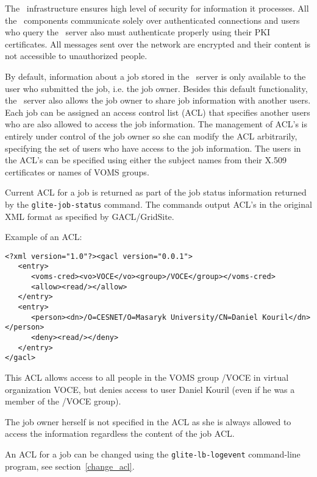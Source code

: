 The \LB\ infrastructure ensures high level of security for information it
processes. All the \LB\ components communicate solely over authenticated
connections and users who query the \LB\ server also must authenticate properly
using their PKI certificates. All messages sent over the network are encrypted
and their content is not accessible to unauthorized people.

By default, information about a job stored in the \LB\ server is only available
to the user who submitted the job, i.e. the job owner.  Besides this default
functionality, the \LB\ server also allows the job owner to share job
information with another users. Each job can be assigned an access control list
(ACL) that specifies another users who are also allowed to access the job
information. The management of ACL's is entirely under control of the job owner
so she can modify the ACL arbitrarily, specifying the set of users who have
access to the job information. The users in the ACL's can be specified using
either the subject names from their X.509 certificates or names of VOMS groups.

Current ACL for a job is returned as part of the job status information
returned by the \verb'glite-job-status' command. The commands output ACL's in
the original XML format as specified by GACL/GridSite. 

Example of an ACL:
\begin{verbatim}
<?xml version="1.0"?><gacl version="0.0.1">
   <entry>
      <voms-cred><vo>VOCE</vo><group>/VOCE</group></voms-cred>
      <allow><read/></allow>
   </entry>
   <entry>
      <person><dn>/O=CESNET/O=Masaryk University/CN=Daniel Kouril</dn></person>
      <deny><read/></deny>
   </entry>
</gacl>
\end{verbatim}

This ACL allows access to all people in the VOMS group /VOCE in virtual
organization VOCE, but denies access to user Daniel Kouril (even if he was a
member of the /VOCE group).

The job owner herself is not specified in the ACL as she is always allowed to
access the information regardless the content of the job ACL.

An ACL for a job can be changed using the \verb'glite-lb-logevent' command-line
program, see section~\ref{change_acl}.

%


